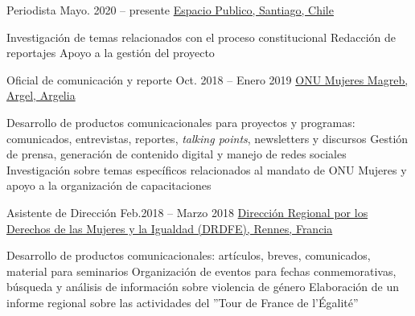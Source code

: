 \begin{joblist}[width=13.2, x=7.8, y=3.2]

\item[Periodista]{Mayo. 2020 -- presente}
    {
    \href{https://www.espaciopublico.cl}{Espacio Publico, Santiago, Chile}
    }
    {
        \vspace{-0.5cm}
        \begin{itemize}
            \iftbftiny \setlength\itemsep{-3pt} \fi
            \cvitem[\checkmark] Investigación de temas relacionados con el proceso constitucional
            \cvitem[\checkmark] Redacción de reportajes
            \cvitem[\checkmark] Apoyo a la gestión del proyecto 
        \end{itemize}
    }


\item[Oficial de comunicación y reporte]{Oct. 2018 -- Enero 2019}
    {
    \href{http://maghreb.unwomen.org/fr}{ONU Mujeres Magreb, Argel, Argelia}
    }
    {
        \vspace{-0.5cm}
        \begin{itemize}
            \iftbftiny \setlength\itemsep{-3pt} \fi
            \cvitem[\checkmark] Desarrollo de productos comunicacionales para proyectos y programas: comunicados, entrevistas, reportes, {\textit{talking points}}, newsletters y discursos
            \cvitem[\checkmark] Gestión de prensa, generación de contenido digital y manejo de redes sociales
            \cvitem[\checkmark] Investigación sobre temas específicos relacionados al mandato de ONU Mujeres y apoyo a la organización de capacitaciones
            
        \end{itemize}
    }


\item[Asistente de Dirección]{Feb.2018 -- Marzo 2018 }
    {
    \href{https://www.egalite-femmes-hommes.gouv.fr/le-secretariat-d-etat/organisation-du-ministere/services-territoriaux/annuaire-des-equipes-regionales-et-departementales/}{Dirección Regional por los Derechos de las Mujeres y la Igualdad (DRDFE), Rennes, Francia}
    }
    {
        \iftbftiny \vspace{-0.5cm} \fi
        \begin{itemize}
            \iftbftiny \setlength\itemsep{-3pt} \fi
            \cvitem[\checkmark] Desarrollo de productos comunicacionales: artículos, breves, comunicados, material para seminarios
            \cvitem[\checkmark] Organización de eventos para fechas conmemorativas, búsqueda y análisis de información sobre violencia de género
            \cvitem[\checkmark] Elaboración de un informe regional sobre las actividades del ''Tour de France de l'Égalité''
        \end{itemize}
    }




\end{joblist}
